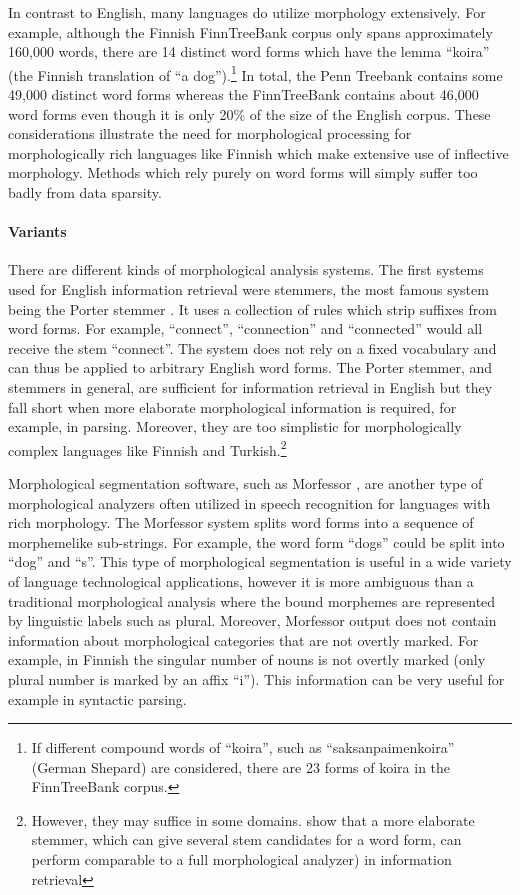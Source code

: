 In contrast to English, many languages do utilize morphology
extensively. For example, although the Finnish FinnTreeBank corpus
\citep{Voutilainen2011} only spans approximately 160,000 words, there
are 14 distinct word forms which have the lemma ``koira'' (the Finnish
translation of ``a dog'').\footnote{If different compound words of
  ``koira'', such as ``saksanpaimenkoira'' (German Shepard) are
  considered, there are 23 forms of koira in the FinnTreeBank corpus.}
In total, the Penn Treebank contains some 49,000 distinct word forms
whereas the FinnTreeBank contains about 46,000 word forms even though
it is only 20\% of the size of the English corpus. These
considerations illustrate the need for morphological processing for
morphologically rich languages like Finnish which make extensive use
of inflective morphology. Methods which rely purely on word forms will
simply suffer too badly from data sparsity.

\paragraph{Variants} There are different kinds of morphological analysis
systems. The first systems used for English information retrieval were
stemmers, the most famous system being the Porter stemmer
\citep{Porter1997}. It uses a collection of rules which strip suffixes
from word forms. For example, ``connect'', ``connection'' and
``connected'' would all receive the stem ``connect''. The system does
not rely on a fixed vocabulary and can thus be applied to arbitrary
English word forms. The Porter stemmer, and stemmers in general, are
sufficient for information retrieval in English but they fall short
when more elaborate morphological information is required, for
example, in parsing. Moreover, they are too simplistic for
morphologically complex languages like Finnish and
Turkish.\footnote{However, they may suffice in some
  domains. \cite{Kettunen2005} show that a more elaborate stemmer,
  which can give several stem candidates for a word form, can perform
  comparable to a full morphological analyzer) in information
  retrieval}

Morphological segmentation software, such as Morfessor
\citep{Creutz2002}, are another type of morphological analyzers often
utilized in speech recognition for languages with rich morphology. The
Morfessor system splits word forms into a sequence of morphemelike
sub-strings. For example, the word form ``dogs'' could be split into
``dog'' and ``s''.  This type of morphological segmentation is useful
in a wide variety of language technological applications, however it
is more ambiguous than a traditional morphological analysis where the
bound morphemes are represented by linguistic labels such as
plural. Moreover, Morfessor output does not contain information about
morphological categories that are not overtly marked. For example, in
Finnish the singular number of nouns is not overtly marked (only
plural number is marked by an affix ``i''). This information can
 be very useful for example in syntactic parsing.

